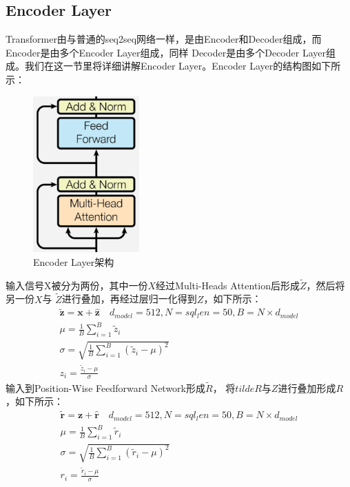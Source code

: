 \documentclass{article}
\begin{document}
\subsection{Encoder Layer}
Transformer由与普通的seq2seq网络一样，是由Encoder和Decoder组成，而Encoder是由多个Encoder Layer组成，同样
Decoder是由多个Decoder Layer组成。我们在这一节里将详细讲解Encoder Layer。Encoder Layer的结构图如下所示：
\begin{figure}[H]
    \caption{Encoder Layer架构}
    \label{f000082}
    \centering
    \includegraphics[height=6cm]{images/f000082}
\end{figure}
输入信号X被分为两份，其中一份$X$经过Multi-Heads Attention后形成$\tilde{Z}$，然后将另一份$X$与
$\tilde{Z}$进行叠加，再经过层归一化得到$Z$，如下所示：
\begin{equation}
\begin{aligned}
\tilde{\boldsymbol{z}}=\boldsymbol{x}+\hat{\boldsymbol{z}} \quad d_{model}=512, N=sql_len=50, B=N \times d_{model} \\
\mu = \frac{1}{B}\sum_{i=1}^{B} \tilde{z}_{i} \\
\sigma = \sqrt{ \frac{1}{B} \sum_{i=1}^{B} (\tilde{z}_i - \mu)^{2} } \\
z_{i} = \frac{\tilde{z}_{i} - \mu}{\sigma}
\end{aligned}
\label{e000118}
\end{equation}
输入到Position-Wise Feedforward Network形成$\tilde{R}$，
将$tilde{R}$与$Z$进行叠加形成$R$，如下所示：
\begin{equation}
\begin{aligned}
\tilde{\boldsymbol{r}}=\boldsymbol{z}+\hat{\boldsymbol{r}} \quad d_{model}=512, N=sql_len=50, B=N \times d_{model} \\
\mu = \frac{1}{B}\sum_{i=1}^{B} \tilde{r}_{i} \\
\sigma = \sqrt{ \frac{1}{B} \sum_{i=1}^{B} (\tilde{r}_i - \mu)^{2} } \\
r_{i} = \frac{\tilde{r}_{i} - \mu}{\sigma}
\end{aligned}
\label{e000118}
\end{equation}
\end{document}
